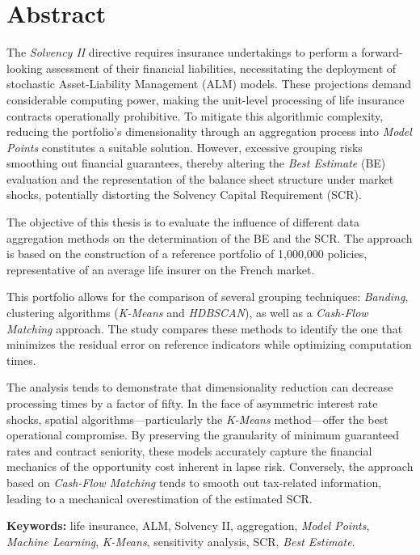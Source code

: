 \chapter*{Abstract}

The \textit{Solvency II} directive requires insurance undertakings to perform a forward-looking assessment of their financial liabilities, necessitating the deployment of stochastic Asset-Liability Management (ALM) models. These projections demand considerable computing power, making the unit-level processing of life insurance contracts operationally prohibitive. To mitigate this algorithmic complexity, reducing the portfolio's dimensionality through an aggregation process into \textit{Model Points} constitutes a suitable solution. However, excessive grouping risks smoothing out financial guarantees, thereby altering the \textit{Best Estimate} (BE) evaluation and the representation of the balance sheet structure under market shocks, potentially distorting the Solvency Capital Requirement (SCR).

The objective of this thesis is to evaluate the influence of different data aggregation methods on the determination of the BE and the SCR. The approach is based on the construction of a reference portfolio of 1,000,000 policies, representative of an average life insurer on the French market.

This portfolio allows for the comparison of several grouping techniques: \textit{Banding}, clustering algorithms (\textit{K-Means} and \textit{HDBSCAN}), as well as a \textit{Cash-Flow Matching} approach. The study compares these methods to identify the one that minimizes the residual error on reference indicators while optimizing computation times.

The analysis tends to demonstrate that dimensionality reduction can decrease processing times by a factor of fifty. In the face of asymmetric interest rate shocks, spatial algorithms—particularly the \textit{K-Means} method—offer the best operational compromise. By preserving the granularity of minimum guaranteed rates and contract seniority, these models accurately capture the financial mechanics of the opportunity cost inherent in lapse risk. Conversely, the approach based on \textit{Cash-Flow Matching} tends to smooth out tax-related information, leading to a mechanical overestimation of the estimated SCR.

\vspace{0.5cm}
\noindent \textbf{Keywords:} life insurance, ALM, Solvency II, aggregation, \textit{Model Points}, \textit{Machine Learning}, \textit{K-Means}, sensitivity analysis, SCR, \textit{Best Estimate}.